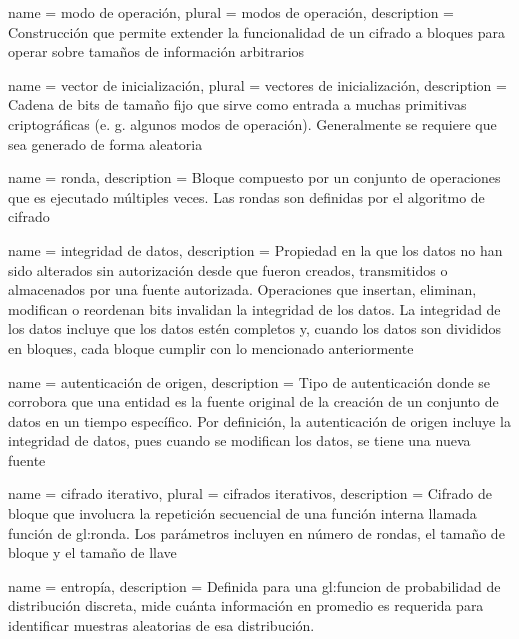 %
%
%

\makeglossaries

{
  name = modo de operación,
  plural = modos de operación,
  description = {
    Construcción que permite extender la funcionalidad de un cifrado a bloques
    para operar sobre tamaños de información arbitrarios%
  }
}

{
  name = vector de inicialización,
  plural = vectores de inicialización,
  description = {
    Cadena de bits de tamaño fijo que sirve como entrada a muchas primitivas
    criptográficas (e. g. algunos modos de operación). Generalmente se requiere
    que sea generado de forma aleatoria%
  }
}

{
  name = ronda,
  description = {
    Bloque compuesto por un conjunto de operaciones que es ejecutado
    múltiples veces. Las rondas son definidas por el algoritmo de cifrado%
  }
}

{
  name = integridad de datos,
  description = {
    Propiedad en la que los datos no han sido alterados sin autorización desde
    que fueron creados, transmitidos o almacenados por una fuente autorizada.
    Operaciones que insertan, eliminan, modifican o reordenan bits invalidan
    la integridad de los datos. La integridad de los datos incluye que los
    datos estén completos y, cuando los datos son divididos en bloques, cada
    bloque cumplir con lo mencionado anteriormente%
  }
}

{
  name = autenticación de origen,
  description = {
    Tipo de autenticación donde se corrobora que una entidad es la fuente
    original de la creación de un conjunto de datos en un tiempo específico.
    Por definición, la autenticación de origen incluye la integridad de datos,
    pues cuando se modifican los datos, se tiene una nueva fuente%
  }
}

{
  name = cifrado iterativo,
  plural = cifrados iterativos,
  description = {
    Cifrado de bloque que involucra la repetición secuencial de
    una función interna llamada función de \gls{gl:ronda}. Los
    parámetros incluyen en número de rondas, el tamaño de bloque y
    el tamaño de llave%
  }
}

{
  name = entropía,
  description = {
    Definida para una \gls{gl:funcion} de probabilidad de distribución discreta,
    mide cuánta información en promedio es requerida para identificar
    muestras aleatorias de esa distribución.
  }
}

